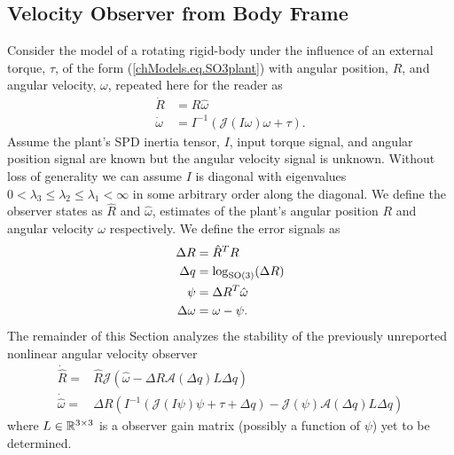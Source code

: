 \subsection{Velocity Observer from Body Frame}
\label{chSMS_ID.sec.AVO}

\newcommand{\omegaInBody}{\psi}

Consider the model of a rotating rigid-body under the influence of an
external torque, $\tau$, of the form (\ref{chModels.eq.SO3plant}) with
angular position, $R$, and angular velocity, $\omega$, repeated here
for the reader as
%
\begin{align} \label{chSMS_ID.eq.SO3plant}
\dot{R} &=R\widehat{\omega}                         \nonumber \\
\dot{\omega} &=I^{-1}\left(\mathcal{J}\left(I\omega\right)\omega+\tau\right).
\end{align}
%
Assume the plant's \ac{SPD} inertia
tensor, $I$, input torque signal, and angular position signal are known
but the angular velocity signal is unknown.  Without loss of
generality we can assume $I$ is diagonal with eigenvalues
$0<\lambda_3\leq \lambda_2\leq \lambda_1<\infty$ in some arbitrary
order along the diagonal.  
We define the observer states as $\hat{R}$ and $\hat{\omega}$,
estimates of the plant's angular position $R$ and angular velocity
$\omega$ respectively.  We define the error signals as
%
\begin{align}
\Delta R&=\hat{R}^T R                  \label{chSMS_ID.eq.AVO_deltaR} \\
\Delta q&=\log_{\SO3}(\Delta R)        \label{chSMS_ID.eq.AVO_deltaq} \\
\omegaInBody&=\Delta R^T \hat{\omega}          \label{chSMS_ID.eq.AVO_omegaInBody}    \\
\Delta\omega&=\omega-\omegaInBody.            \label{chSMS_ID.eq.AVO_deltaw} 
\end{align}
%
The remainder of this Section analyzes the stability of
the previously unreported nonlinear angular velocity observer
%  
\begin{align}\label{chSMS_ID.eq.AVO}
\dot{\hat{R}} =&\hat{R} \mathcal{J}\left(\hat{\omega}-\Delta R\mathcal{A}(\Delta q) L \Delta q\right)
                                                          \nonumber \\
\dot{\hat{\omega}} 
  =&\Delta R \left( I^{-1}\left(\mathcal{J}\left(I \omegaInBody\right)\omegaInBody + \tau + 
    \Delta q\right)-\mathcal{J}(\omegaInBody)\mathcal{A}(\Delta q)L\Delta q\right)
\end{align}
%
where $L\in\mathbb{R}^{3\times 3}$ is a observer gain matrix (possibly a
function of $\psi$) yet to be determined.



